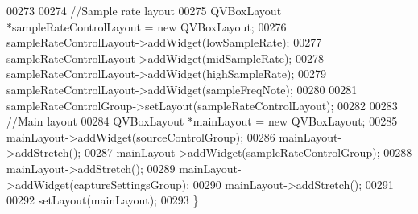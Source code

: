 \begin{DoxyCode}
00273 
00274     \textcolor{comment}{//Sample rate layout}
00275     QVBoxLayout *sampleRateControlLayout = \textcolor{keyword}{new} QVBoxLayout;
00276     sampleRateControlLayout->addWidget(lowSampleRate);
00277     sampleRateControlLayout->addWidget(midSampleRate);
00278     sampleRateControlLayout->addWidget(highSampleRate);
00279     sampleRateControlLayout->addWidget(sampleFreqNote);
00280 
00281     sampleRateControlGroup->setLayout(sampleRateControlLayout);
00282 
00283     \textcolor{comment}{//Main layout}
00284     QVBoxLayout *mainLayout = \textcolor{keyword}{new} QVBoxLayout;
00285     mainLayout->addWidget(sourceControlGroup);
00286     mainLayout->addStretch();
00287     mainLayout->addWidget(sampleRateControlGroup);
00288     mainLayout->addStretch();
00289     mainLayout->addWidget(captureSettingsGroup);
00290     mainLayout->addStretch();
00291 
00292     setLayout(mainLayout);
00293 \}
\end{DoxyCode}
